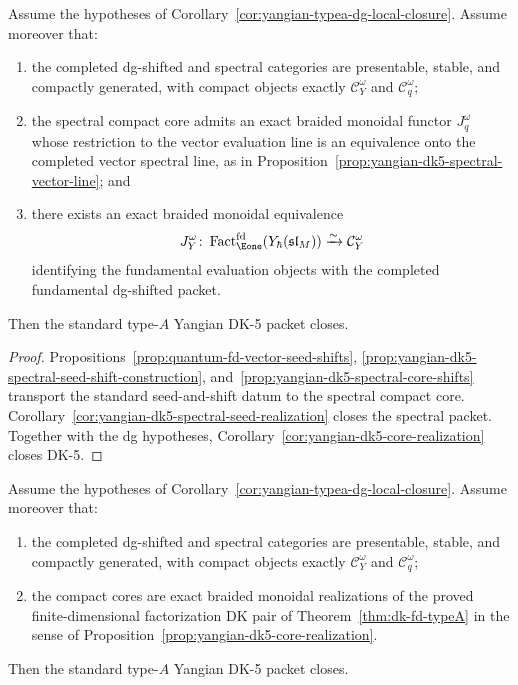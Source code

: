 \begin{corollary}
\label{cor:yangian-dk5-dg-half-only}
Assume the hypotheses of
Corollary~\ref{cor:yangian-typea-dg-local-closure}.  Assume moreover
that:
\begin{enumerate}[label=\textup{(\roman*)}]
\item the completed dg-shifted and spectral categories are presentable,
  stable, and compactly generated, with compact objects exactly
  \(\mathcal{C}_Y^\omega\) and \(\mathcal{C}_q^\omega\);
\item the spectral compact core admits an exact braided monoidal
  functor \(J_q^\omega\) whose restriction to the vector evaluation
  line is an equivalence onto the completed vector spectral line, as in
  Proposition~\ref{prop:yangian-dk5-spectral-vector-line}; and
\item there exists an exact braided monoidal equivalence
  \[
  J_Y^\omega\colon
  \operatorname{Fact}_{\Eone}^{\mathrm{fd}}(Y_\hbar(\mathfrak{sl}_M))
  \xrightarrow{\sim}
  \mathcal{C}_Y^\omega
  \]
  identifying the fundamental evaluation objects with the completed
  fundamental dg-shifted packet.
\end{enumerate}
Then the standard type-$A$ Yangian DK-5 packet closes.

\end{corollary}

\begin{proof}
Propositions~\ref{prop:quantum-fd-vector-seed-shifts},
\ref{prop:yangian-dk5-spectral-seed-shift-construction},
and~\ref{prop:yangian-dk5-spectral-core-shifts} transport the standard
seed-and-shift datum to the spectral compact core.
Corollary~\ref{cor:yangian-dk5-spectral-seed-realization} closes the
spectral packet.  Together with the dg hypotheses,
Corollary~\ref{cor:yangian-dk5-core-realization} closes DK-5.
\end{proof}

\begin{corollary}
\label{cor:yangian-dk5-core-realization}
Assume the hypotheses of
Corollary~\ref{cor:yangian-typea-dg-local-closure}.  Assume moreover
that:
\begin{enumerate}[label=\textup{(\roman*)}]
\item the completed dg-shifted and spectral categories are presentable,
  stable, and compactly generated, with compact objects exactly
  $\mathcal{C}_Y^\omega$ and $\mathcal{C}_q^\omega$;
\item the compact cores are exact braided monoidal realizations of the
  proved finite-dimensional factorization DK pair of
  Theorem~\ref{thm:dk-fd-typeA} in the sense of
  Proposition~\ref{prop:yangian-dk5-core-realization}.
\end{enumerate}
Then the standard type-$A$ Yangian DK-5 packet closes.

\end{corollary}

